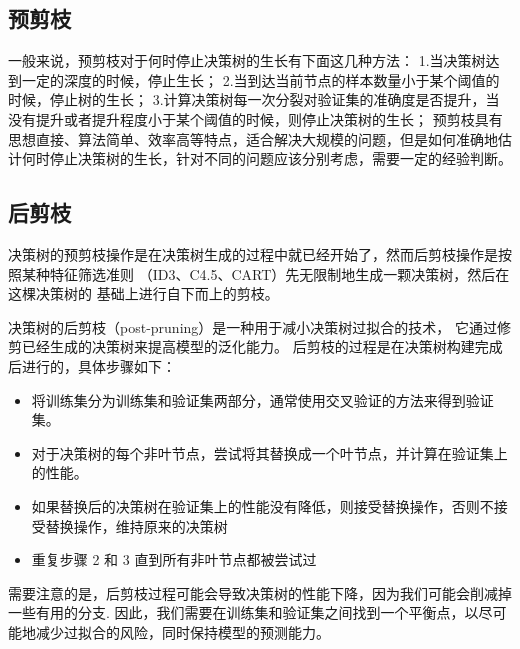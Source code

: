 \documentclass{SHUarticle}
\begin{document}
\subsection{预剪枝}
一般来说，预剪枝对于何时停止决策树的生长有下面这几种方法：
1.当决策树达到一定的深度的时候，停止生长；
2.当到达当前节点的样本数量小于某个阈值的时候，停止树的生长；
3.计算决策树每一次分裂对验证集的准确度是否提升，当没有提升或者提升程度小于某个阈值的时候，则停止决策树的生长；
预剪枝具有思想直接、算法简单、效率高等特点，适合解决大规模的问题，但是如何准确地估计何时停止决策树的生长，针对不同的问题应该分别考虑，需要一定的经验判断。
\subsection{后剪枝}
决策树的预剪枝操作是在决策树生成的过程中就已经开始了，然而后剪枝操作是按照某种特征筛选准则
（ID3、C4.5、CART）先无限制地生成一颗决策树，然后在这棵决策树的
基础上进行自下而上的剪枝。\par 

决策树的后剪枝（post-pruning）是一种用于减小决策树过拟合的技术，
它通过修剪已经生成的决策树来提高模型的泛化能力。
后剪枝的过程是在决策树构建完成后进行的，具体步骤如下：
\begin{itemize}
	\item 将训练集分为训练集和验证集两部分，通常使用交叉验证的方法来得到验证集。
	\item 对于决策树的每个非叶节点，尝试将其替换成一个叶节点，并计算在验证集上的性能。
	\item 如果替换后的决策树在验证集上的性能没有降低，则接受替换操作，否则不接受替换操作，维持原来的决策树
	\item 重复步骤 2 和 3 直到所有非叶节点都被尝试过
\end{itemize}
需要注意的是，后剪枝过程可能会导致决策树的性能下降，因为我们可能会削减掉一些有用的分支.
因此，我们需要在训练集和验证集之间找到一个平衡点，以尽可能地减少过拟合的风险，同时保持模型的预测能力。
\end{document}
